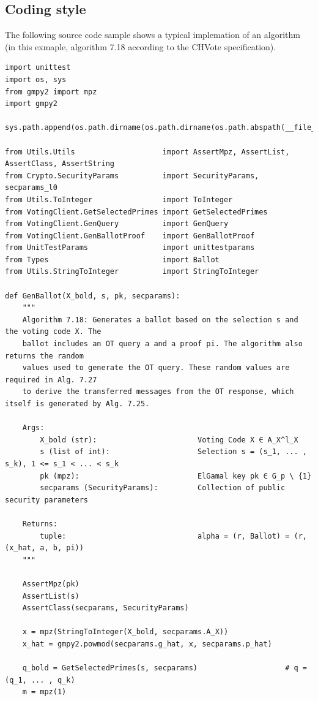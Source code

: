 \subsection{Coding style}
The following source code sample shows a typical implemation of an algorithm (in this exmaple, algorithm 7.18 according to the CHVote specification).

\begin{verbatim}
import unittest
import os, sys
from gmpy2 import mpz
import gmpy2

sys.path.append(os.path.dirname(os.path.dirname(os.path.abspath(__file__))))

from Utils.Utils                    import AssertMpz, AssertList, AssertClass, AssertString
from Crypto.SecurityParams          import SecurityParams, secparams_l0
from Utils.ToInteger                import ToInteger
from VotingClient.GetSelectedPrimes import GetSelectedPrimes
from VotingClient.GenQuery          import GenQuery
from VotingClient.GenBallotProof    import GenBallotProof
from UnitTestParams                 import unittestparams
from Types                          import Ballot
from Utils.StringToInteger          import StringToInteger

def GenBallot(X_bold, s, pk, secparams):
    """
    Algorithm 7.18: Generates a ballot based on the selection s and the voting code X. The
    ballot includes an OT query a and a proof pi. The algorithm also returns the random
    values used to generate the OT query. These random values are required in Alg. 7.27
    to derive the transferred messages from the OT response, which itself is generated by Alg. 7.25.

    Args:
        X_bold (str):                       Voting Code X ∈ A_X^l_X
        s (list of int):                    Selection s = (s_1, ... , s_k), 1 <= s_1 < ... < s_k
        pk (mpz):                           ElGamal key pk ∈ G_p \ {1}
        secparams (SecurityParams):         Collection of public security parameters

    Returns:
        tuple:                              alpha = (r, Ballot) = (r, (x_hat, a, b, pi))
    """

    AssertMpz(pk)
    AssertList(s)
    AssertClass(secparams, SecurityParams)

    x = mpz(StringToInteger(X_bold, secparams.A_X))
    x_hat = gmpy2.powmod(secparams.g_hat, x, secparams.p_hat)

    q_bold = GetSelectedPrimes(s, secparams)                    # q = (q_1, ... , q_k)
    m = mpz(1)


\end{verbatim}
